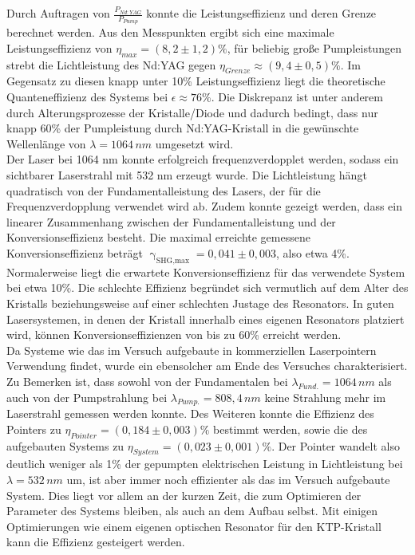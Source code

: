 \documentclass[twoside,colorback,accentcolor=tud4c,11pt]{tudreport}
\begin{document}
Durch Auftragen von $\frac{P_{Nd:YAG}}{P_{Pump}}$ konnte die Leistungseffizienz und deren Grenze berechnet werden. Aus den Messpunkten ergibt sich eine maximale Leistungseffizienz von $\eta_{max}=(8,2\pm 1,2)\%$, für beliebig große Pumpleistungen strebt die Lichtleistung des Nd:YAG gegen $\eta_{Grenze}\approx (9,4\pm 0,5)\%$. Im Gegensatz zu diesen knapp unter 10\% Leistungseffizienz liegt die theoretische Quanteneffizienz des Systems bei $\epsilon\approx 76\%$. Die Diskrepanz ist unter anderem durch Alterungsprozesse der Kristalle/Diode und dadurch bedingt, dass nur knapp 60\% der Pumpleistung durch Nd:YAG-Kristall in die gewünschte Wellenlänge von $\lambda=1064\,\si{nm}$ umgesetzt wird.\\
Der Laser bei 1064 nm konnte erfolgreich frequenzverdopplet werden, sodass ein sichtbarer Laserstrahl mit 532 nm erzeugt wurde. Die Lichtleistung hängt quadratisch von der Fundamentalleistung des Lasers, der für die Frequenzverdopplung verwendet wird ab. Zudem konnte gezeigt werden, dass ein linearer Zusammenhang zwischen der Fundamentalleistung und der Konversionseffizienz besteht. Die maximal erreichte gemessene Konversionseffizienz beträgt $\upgamma_{\text{SHG,max}}=0,041\pm0,003$, also etwa 4\%. Normalerweise liegt die erwartete Konversionseffizienz für das verwendete System bei etwa 10\%. Die schlechte Effizienz begründet sich vermutlich auf dem Alter des Kristalls beziehungsweise auf einer schlechten Justage des Resonators. In guten Lasersystemen, in denen der Kristall innerhalb eines eigenen Resonators platziert wird, können Konversionseffizienzen von bis zu 60\% erreicht werden.\\
Da Systeme wie das im Versuch aufgebaute in kommerziellen Laserpointern Verwendung findet, wurde ein ebensolcher am Ende des Versuches charakterisiert. Zu Bemerken ist, dass sowohl von der Fundamentalen bei $\lambda_{Fund.}=1064\,\si{nm}$ als auch von der Pumpstrahlung bei $\lambda_{Pump.}=808,4\,\si{nm}$ keine Strahlung mehr im Laserstrahl gemessen werden konnte. Des Weiteren konnte die Effizienz des Pointers zu $\eta_{Pointer}=(0,184\pm 0,003) \%$ bestimmt werden, sowie die des aufgebauten Systems zu $\eta_{System}=(0,023\pm 0,001) \%$. Der Pointer wandelt also deutlich weniger als 1\% der gepumpten elektrischen Leistung in Lichtleistung bei $\lambda=532\,\si{nm}$ um, ist aber immer noch effizienter als das im Versuch aufgebaute System. Dies liegt vor allem an der kurzen Zeit, die zum Optimieren der Parameter des Systems bleiben, als auch an dem Aufbau selbst. Mit einigen Optimierungen wie einem eigenen optischen Resonator für den KTP-Kristall kann die Effizienz gesteigert werden.
\end{document}
